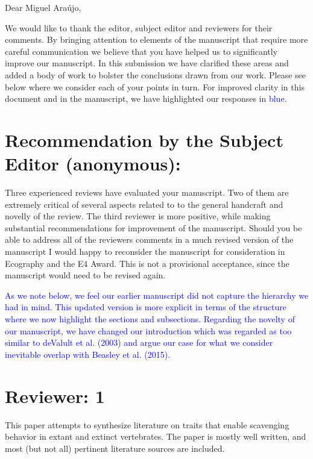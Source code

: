 \documentclass[12pt,letterpaper]{article}
\begin{document}
Dear Miguel Ara\'{u}jo,

\bigskip

We would like to thank the editor, subject editor and reviewers for their comments. By bringing attention to elements of the manuscript that require more careful communication we believe that you have helped us to significantly improve our manuscript. In this submission we have clarified these areas and added a body of work to bolster the conclusions drawn from our work. Please see below where we consider each of your points in turn.
For improved clarity in this document and in the manuscript, we have highlighted our responses in \textcolor{blue}{blue}.

\section{Recommendation by the Subject Editor (anonymous):}
Three experienced reviews have evaluated your manuscript.
Two of them are extremely critical of several aspects related to to the general handcraft and novelly of the review.
The third reviewer is more positive, while making substantial recommendations for improvement of the manuscript.
Should you be able to address all of the reviewers comments in a much revised version of the manuscript I would happy to reconsider the manuscript for consideration in Ecography and the E4 Award.
This is not a provisional acceptance, since the manuscript would need to be revised again.

\smallskip

\textcolor{blue}{As we note below, we feel our earlier manuscript did not capture the hierarchy we had in mind.
This updated version is more explicit in terms of the structure where we now highlight the sections and subsections.
Regarding the novelty of our manuscript, we have changed our introduction which was regarded as too similar to deValult et al. (2003) and argue our case for what we consider inevitable overlap with Beasley et al. (2015).} 

\section{Reviewer: 1}
This paper attempts to synthesize literature on traits that enable scavenging behavior in extant and extinct vertebrates.
The paper is mostly well written, and most (but not all) pertinent literature sources are included.
\end{document}

